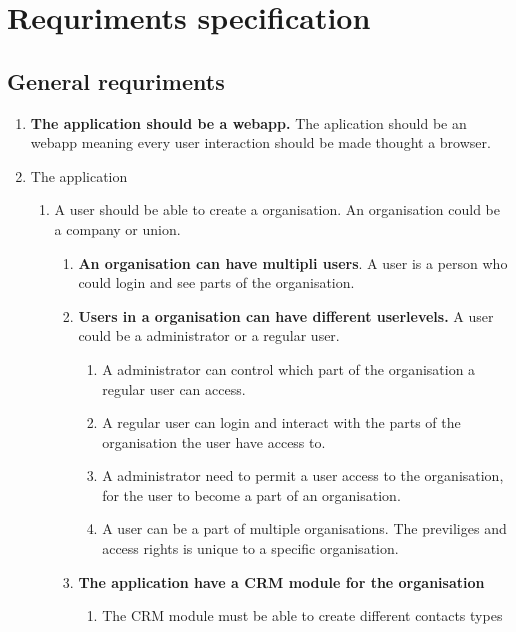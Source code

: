 \section{Requriments specification}

\subsection{General requriments}

\begin{enumerate}
    \item \textbf{The application should be a webapp.} The aplication should be an webapp meaning every user interaction should be made thought a browser.
    \item The application
    \begin{enumerate}
        \item {A user should be able to create a organisation.} An organisation could be a company or union.
        \begin{enumerate}
            \item \textbf{An organisation can have multipli users}. A user is a person who could login and see parts of the organisation.
            \item \textbf{Users in a organisation can have different userlevels.} A user could be a administrator or a regular user.
            \begin{enumerate}
                \item A administrator can control which part of the organisation a regular user can access.
                \item A regular user can login and interact with the parts of the organisation the user have access to.
                \item A administrator need to permit a user access to the organisation, for the user to become a part of an organisation.
                \item A user can be a part of multiple organisations. The previliges and access rights is unique to a specific organisation.
            \end{enumerate}
            \item \textbf{The application have a CRM module for the organisation}
            \begin{enumerate}
                \item The CRM module must be able to create different contacts types
                \begin{itemize}

\end{itemize}
\end{enumerate}
\end{enumerate}
\end{enumerate}
\end{enumerate}
